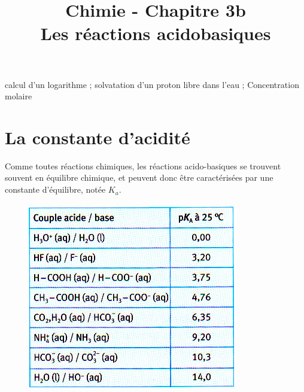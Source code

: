 \documentclass[11pt,a4paper]{article}
\title{\large Chimie - Chapitre 3b \\ \LARGE  Les réactions acidobasiques}
\begin{document}
\maketitle
\vspace{-1cm}
\begin{tcolorbox}[title=Notions de la classe de première à rappeler]
calcul d'un logarithme ; solvatation d'un proton libre dans l'eau ; Concentration molaire
\end{tcolorbox}
\tableofcontents

\section{La constante d'acidité} %
Comme toutes réactions chimiques, les réactions acido-basiques se trouvent souvent en équilibre chimique, et peuvent donc être caractérisées par une constante d’équilibre, notée $K_a$. 


\begingroup
\begin{figure}
  \centering
  \includegraphics[width=0.95\linewidth]{imgs/c3/ka.jpg}
\end{figure}
\end{document}
